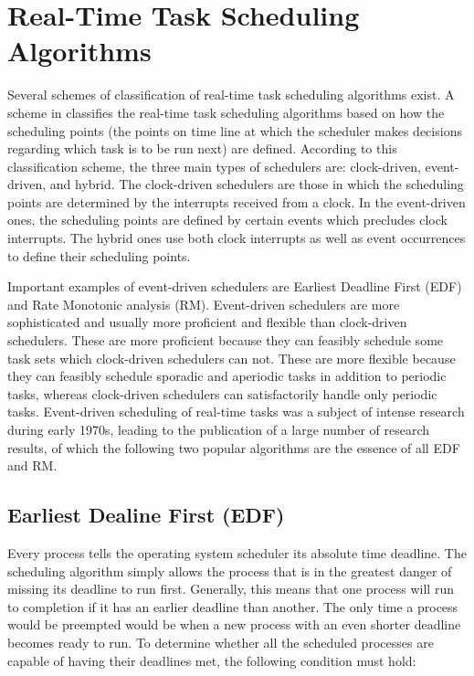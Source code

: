 \documentclass[10pt,article]{IEEEtran}
\begin{document}
\section{Real-Time Task Scheduling Algorithms}
Several schemes of classification of real-time task scheduling algorithms exist. A scheme in \cite{mall} classifies the real-time task scheduling algorithms based on how the scheduling points (the points on time line at which the scheduler makes decisions regarding which task is to be run next) are defined. According to this classification scheme, the three main types of schedulers are: clock-driven, event-driven, and hybrid. The clock-driven schedulers are those in which the scheduling points are determined by the interrupts received from a clock. In the event-driven ones, the scheduling points are defined by certain events which precludes clock interrupts. The hybrid ones use both clock interrupts as well as event occurrences to define their scheduling points.


Important examples of event-driven schedulers are Earliest Deadline First (EDF) and Rate Monotonic analysis (RM). Event-driven schedulers are more sophisticated and usually more proficient and flexible than clock-driven schedulers. These are more proficient because they can feasibly schedule some task sets which clock-driven schedulers can not. These are more flexible because they can feasibly schedule sporadic and aperiodic tasks in addition to periodic tasks, whereas clock-driven schedulers can satisfactorily handle only periodic tasks\cite{mall}. Event-driven scheduling of real-time tasks was a subject of intense research during early 1970s, leading to the publication of a large number of research results, of which the following two popular algorithms are the essence of all EDF and RM\cite{w-s-liu}.



\subsection{Earliest Dealine First (EDF)}
Every process tells the operating system scheduler its absolute time deadline. The scheduling algorithm simply allows the process that is in the greatest danger of missing its deadline to run first. Generally, this means that one process will run to completion if it has an earlier deadline than another. The only time a process would be preempted would be when a new process with an even shorter deadline becomes ready to run. To determine whether all the scheduled processes are capable of having their deadlines met, the following condition must hold:
\end{document}
